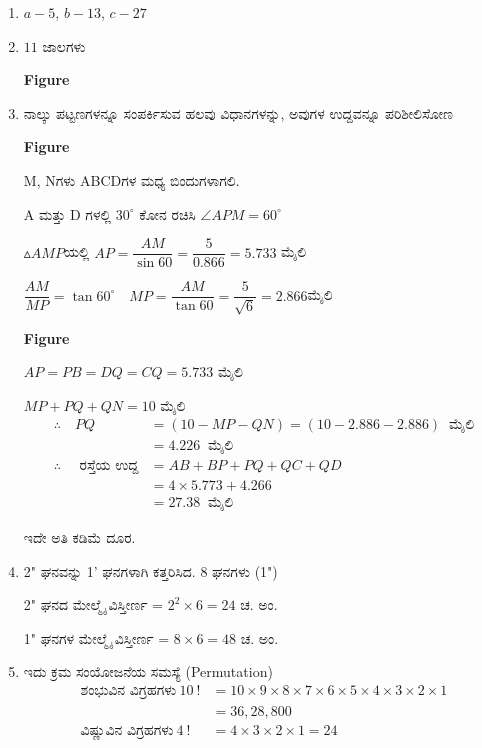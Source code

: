 \begin{enumerate}
\item $a - 5$, $b - 13$, $c - 27$

\item $11$ ಜಾಲಗಳು 

\begin{center}
{\bf Figure}
\end{center}

\item ನಾಲ್ಕು ಪಟ್ಟಣಗಳನ್ನೂ ಸಂಪರ್ಕಿಸುವ ಹಲವು ವಿಧಾನಗಳನ್ನು, ಅವುಗಳ ಉದ್ದವನ್ನೂ ಪರಿಶೀಲಿಸೋಣ

\begin{center}
{\bf Figure}
\end{center}

M, Nಗಳು ABCDಗಳ ಮಧ್ಯ ಬಿಂದುಗಳಾಗಲಿ. 

A ಮತ್ತು D ಗಳಲ್ಲಿ $30^{\circ}$ ಕೋನ ರಚಿಸಿ $\angle{APM} = 60^{\circ}$

$\vartriangle AMP$ಯಲ್ಲಿ $AP = \dfrac{AM}{\sin 60} = \dfrac{5}{0.866} = 5.733$ ಮೈಲಿ 

$\dfrac{AM}{MP} = \tan 60^{\circ}\quad MP = \dfrac{AM}{\tan 60} = \dfrac{5}{\sqrt{6}} = 2.866$ಮೈಲಿ 

\begin{center}
{\bf Figure}
\end{center}

$AP = PB = DQ = CQ = 5.733$ ಮೈಲಿ 

$MP + PQ + QN = 10$ ಮೈಲಿ
\begin{align*}
\therefore\quad PQ & = (10 - MP - QN) = (10 - 2.886 - 2.886) ~\text{ ಮೈಲಿ}\\
& = 4.226 ~\text{ ಮೈಲಿ}\\
\therefore\quad \text{ ರಸ್ತೆಯ ಉದ್ದ} & = AB + BP + PQ + QC + QD\\
& = 4 \times 5.773 + 4.266\\
& = 27.38 ~\text{ ಮೈಲಿ}
\end{align*}

ಇದೇ ಅತಿ ಕಡಿಮೆ ದೂರ.

\item 2" ಘನವನ್ನು 1' ಘನಗಳಾಗಿ ಕತ್ತರಿಸಿದ. 8 ಘನಗಳು (1")

2" ಘನದ ಮೇಲ್ಮೈ ವಿಸ್ತೀರ್ಣ = $2^{2} \times 6 = 24$ ಚ. ಅಂ. 

1" ಘನಗಳ ಮೇಲ್ಮೈ ವಿಸ್ತೀರ್ಣ = $8 \times 6 = 48$ ಚ. ಅಂ. 

\item ಇದು ಕ್ರಮ ಸಂಯೋಜನೆಯ ಸಮಸ್ಯೆ (Permutation) 
\begin{align*}
\text{ಶಂಭುವಿನ ವಿಗ್ರಹಗಳು}~ 10~! & = 10 \times 9 \times 8 \times 7 \times 6 \times 5 \times 4 \times 3 \times 2 \times 1\\
& = 36, 28, 800\\
\text{ವಿಷ್ಣುವಿನ ವಿಗ್ರಹಗಳು}~ 4~! & = 4 \times 3 \times 2 \times 1 = 24
\end{align*}


\end{enumerate}
